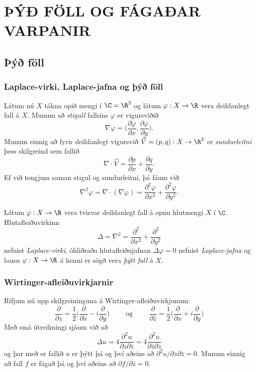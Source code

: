\chapter{ÞÝÐ FÖLL OG FÁGAÐAR VARPANIR}


\section{Þýð föll}


\subsection*{Laplace-virki, Laplace-jafna og þýð föll }

Látum nú $X$ tákna opið mengi í $\C=\R^2$ og látum $\varphi:X\to \R$
vera deildanlegt fall á $X$. Munum að {\it stigull} fallsins
$\varphi$  er vigursviðið 
$$
\nabla \varphi=\big(\dfrac{\partial \varphi}{\partial x},
\dfrac{\partial \varphi}{\partial y}\big).
$$
Munum einnig að fyrir deildanlegt vigursvið  $\vec V=(p,q):X\to \R^ 2$ er 
{\it sundurleitni} þess skilgreind sem fallið
$$
\nabla\cdot \vec V=\dfrac{\partial p}{\partial x}+\dfrac{\partial
q}{\partial y}.
$$
Ef við tengjum saman stigul og sundurleitni, þá fáum við  
$$
\nabla^2\varphi=\nabla\cdot (\nabla \varphi)= \dfrac {\partial^2 \varphi}{\partial x^2}+  
\dfrac {\partial^2 \varphi}{\partial y^2}.  
$$

\begin{sk} Látum  $\varphi:X\to \R$ vera tvisvar deildanlegt fall 
á opnu hlutmengi $X$ í $\C$.  Hlutafleiðuvirkinn
$$
{\Delta}=\nabla^2=\dfrac {\partial^2 }{\partial x^2}+  
\dfrac {\partial^2 }{\partial y^2}
$$
nefnist {\it Laplace-virki},
óhliðraða hlutafleiðujafnan
${\Delta}\varphi=0$ nefnist {\it
Laplace-jafna}
og lausn $\varphi:X\to \R$  á  henni er sögð vera {\it þýtt fall} á $X$.
\end{sk}

\subsection*{Wirtinger-afleiðuvirkjarnir}

Rifjum nú upp skilgreininguna á Wirtinger-afleiðuvirkjunum:
$$
\dfrac{\partial}{\partial z}=\dfrac 12\bigg(\dfrac{\partial }{\partial x}-i
\dfrac{\partial}{\partial y}\bigg)
\qquad \text{ og } \qquad 
\dfrac{\partial}{\partial \bar z}=\dfrac 12\bigg(\dfrac{\partial
}{\partial x}+i \dfrac{\partial}{\partial y}\bigg)
$$
Með smá útreikningi sjáum við að
$$
\Delta u=4\dfrac{\partial^2 u}{\partial z\partial \bar z}
=4\dfrac{\partial^2 u}{\partial \bar z\partial z}
$$
og þar með er fallið $u$ er þýtt þá og því aðeins að
$\partial^2 u/\partial z\partial\bar z =0$.  Munum einnig að fall $f$
er fágað þá og því aðeins að $\partial f/\partial \bar z=0$.



